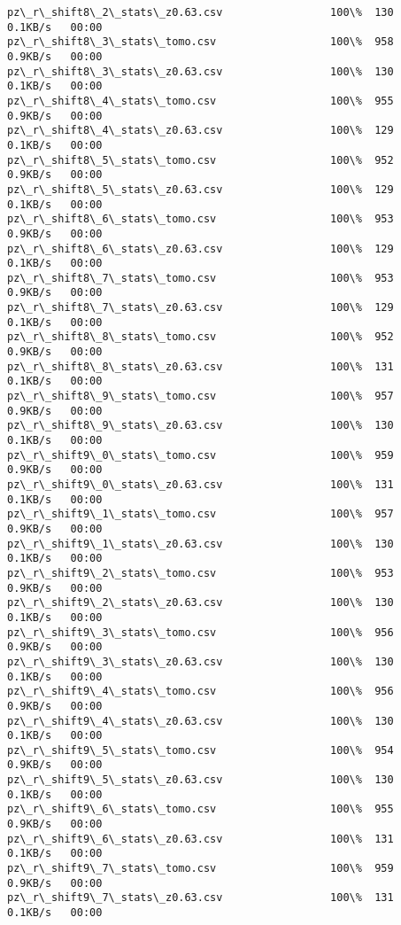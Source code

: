 \documentclass[11pt]{article}
\begin{document}
\begin{Verbatim}[commandchars=\\\{\}]
pz\_r\_shift8\_2\_stats\_z0.63.csv                 100\%  130     0.1KB/s   00:00    
pz\_r\_shift8\_3\_stats\_tomo.csv                  100\%  958     0.9KB/s   00:00    
pz\_r\_shift8\_3\_stats\_z0.63.csv                 100\%  130     0.1KB/s   00:00    
pz\_r\_shift8\_4\_stats\_tomo.csv                  100\%  955     0.9KB/s   00:00    
pz\_r\_shift8\_4\_stats\_z0.63.csv                 100\%  129     0.1KB/s   00:00    
pz\_r\_shift8\_5\_stats\_tomo.csv                  100\%  952     0.9KB/s   00:00    
pz\_r\_shift8\_5\_stats\_z0.63.csv                 100\%  129     0.1KB/s   00:00    
pz\_r\_shift8\_6\_stats\_tomo.csv                  100\%  953     0.9KB/s   00:00    
pz\_r\_shift8\_6\_stats\_z0.63.csv                 100\%  129     0.1KB/s   00:00    
pz\_r\_shift8\_7\_stats\_tomo.csv                  100\%  953     0.9KB/s   00:00    
pz\_r\_shift8\_7\_stats\_z0.63.csv                 100\%  129     0.1KB/s   00:00    
pz\_r\_shift8\_8\_stats\_tomo.csv                  100\%  952     0.9KB/s   00:00    
pz\_r\_shift8\_8\_stats\_z0.63.csv                 100\%  131     0.1KB/s   00:00    
pz\_r\_shift8\_9\_stats\_tomo.csv                  100\%  957     0.9KB/s   00:00    
pz\_r\_shift8\_9\_stats\_z0.63.csv                 100\%  130     0.1KB/s   00:00    
pz\_r\_shift9\_0\_stats\_tomo.csv                  100\%  959     0.9KB/s   00:00    
pz\_r\_shift9\_0\_stats\_z0.63.csv                 100\%  131     0.1KB/s   00:00    
pz\_r\_shift9\_1\_stats\_tomo.csv                  100\%  957     0.9KB/s   00:00    
pz\_r\_shift9\_1\_stats\_z0.63.csv                 100\%  130     0.1KB/s   00:00    
pz\_r\_shift9\_2\_stats\_tomo.csv                  100\%  953     0.9KB/s   00:00    
pz\_r\_shift9\_2\_stats\_z0.63.csv                 100\%  130     0.1KB/s   00:00    
pz\_r\_shift9\_3\_stats\_tomo.csv                  100\%  956     0.9KB/s   00:00    
pz\_r\_shift9\_3\_stats\_z0.63.csv                 100\%  130     0.1KB/s   00:00    
pz\_r\_shift9\_4\_stats\_tomo.csv                  100\%  956     0.9KB/s   00:00    
pz\_r\_shift9\_4\_stats\_z0.63.csv                 100\%  130     0.1KB/s   00:00    
pz\_r\_shift9\_5\_stats\_tomo.csv                  100\%  954     0.9KB/s   00:00    
pz\_r\_shift9\_5\_stats\_z0.63.csv                 100\%  130     0.1KB/s   00:00    
pz\_r\_shift9\_6\_stats\_tomo.csv                  100\%  955     0.9KB/s   00:00    
pz\_r\_shift9\_6\_stats\_z0.63.csv                 100\%  131     0.1KB/s   00:00    
pz\_r\_shift9\_7\_stats\_tomo.csv                  100\%  959     0.9KB/s   00:00    
pz\_r\_shift9\_7\_stats\_z0.63.csv                 100\%  131     0.1KB/s   00:00    

\end{Verbatim}
\end{document}
